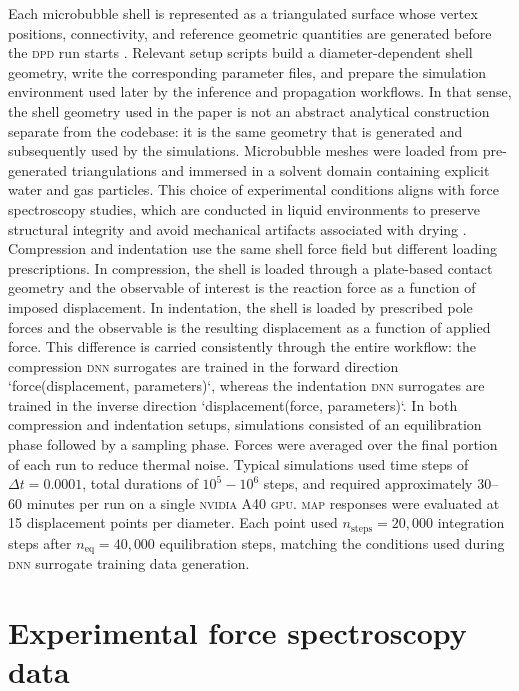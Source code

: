 \documentclass[%
 aip,
 jcp,
 amsmath,amssymb,
 preprint,%
]{revtex4-1}
\begin{document}
Each microbubble shell is represented as a triangulated surface whose vertex positions, connectivity, and reference geometric quantities are generated before the \textsc{dpd} run starts \cite{ntarakas2025dissipative}. Relevant setup scripts build a diameter-dependent shell geometry, write the corresponding parameter files, and prepare the simulation environment used later by the inference and propagation workflows. In that sense, the shell geometry used in the paper is not an abstract analytical construction separate from the codebase: it is the same geometry that is generated and subsequently used by the simulations. Microbubble meshes were loaded from pre-generated triangulations and immersed in a solvent domain containing explicit water and gas particles. This choice of experimental conditions aligns with force spectroscopy studies, which are conducted in liquid environments to preserve structural integrity and avoid mechanical artifacts associated with drying \cite{buchner2012}. Compression and indentation use the same shell force field but different loading prescriptions. In compression, the shell is loaded through a plate-based contact geometry and the observable of interest is the reaction force as a function of imposed displacement. In indentation, the shell is loaded by prescribed pole forces and the observable is the resulting displacement as a function of applied force. This difference is carried consistently through the entire workflow: the compression \textsc{dnn} surrogates are trained in the forward direction `force(displacement, parameters)`, whereas the indentation \textsc{dnn} surrogates are trained in the inverse direction `displacement(force, parameters)`. In both compression and indentation setups, simulations consisted of an equilibration phase followed by a sampling phase. Forces were averaged over the final portion of each run to reduce thermal noise. Typical simulations used time steps of $\Delta t = 0.0001$, total durations of $10^5 - 10^6$ steps, and required approximately 30--60 minutes per run on a single \textsc{nvidia} A40 \textsc{gpu}. \textsc{map} responses were evaluated at 15 displacement points per diameter. Each point used $n_\mathrm{steps} = 20{,}000$ integration steps after $n_\mathrm{eq} = 40{,}000$ equilibration steps, matching the conditions used during \textsc{dnn} surrogate training data generation.

\newpage
\section{Experimental force spectroscopy data}
\label{app:exp_details}
\end{document}
